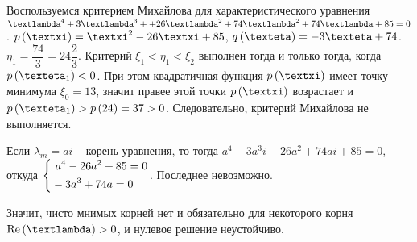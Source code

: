 \documentclass[a5paper,10pt]{article}
\begin{document}
Воспользуемся критерием Михайлова для характеристического уравнения 
$\lambda^4 + 3\lambda^3 + \linebreak + 26\lambda^2 + 74\lambda^2 + 74\lambda + 85 = 0$.
$p\br{\xi} = \xi^2 - 26\xi + 85$,
$q\br{\eta} = -3\eta + 74$.
$\eta_{1} = \dfrac {74} {3} = 24 \dfrac {2}{3}$.
Критерий $\xi_{1} < \eta_{1} < \xi_{2}$ выполнен тогда и только тогда, когда $p\br{\eta_{1}} < 0$. При этом квадратичная функция $p\br{\xi}$ имеет точку минимума $\xi_{0} = 13$, значит правее этой точки $p\br{\xi}$ возрастает и 
$p\br{\eta_{1}} > p\br{24} = 37 > 0$. Следовательно, критерий Михайлова не выполняется.

Если $\lambda_{m} = ai$ -- корень уравнения, то тогда $a^4 - 3a^3 i - 26a^2 + 74 ai + 85 = 0$, откуда 
$\left\{ \begin{aligned}&\ a^4 - 26a^2 + 85 = 0 \\& -3a^3 + 74a = 0\end{aligned} \right.$. Последнее невозможно.

Значит, чисто мнимых корней нет и обязательно для некоторого корня $\Re\br{\lambda} > 0$, и нулевое решение неустойчиво.
\end{document}

